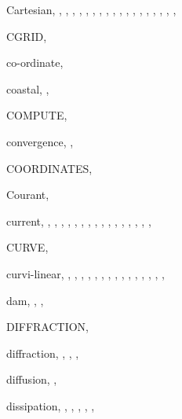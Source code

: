\documentclass[12pt]{book}
\begin{document}
\begin{theindex}
  \item Cartesian, , , , 
		, , , 
		, , , 
		, , , 
		, , , 
		, , , 
  \item CGRID, 
  \item co-ordinate, 
  \item coastal, , 
  \item COMPUTE, 
  \item convergence, , 
  \item COORDINATES, 
  \item Courant, 
  \item current, , , , 
		, , , 
		, , , 
		, , , 
		, , , 
		, 
  \item CURVE, 
  \item curvi-linear, , , , 
		, , , 
		, , , 
		, , , 
		, , , 

  \indexspace

  \item dam, , , 
  \item DIFFRACTION, 
  \item diffraction, , , , 
  \item diffusion, , 
  \item dissipation, , , , 
		, , 

  \indexspace


\end{theindex}
\end{document}
